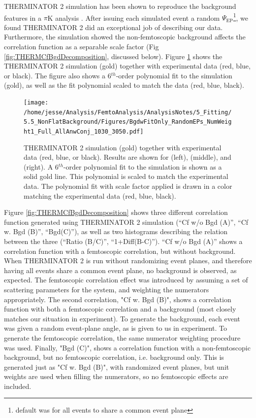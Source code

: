 \documentclass[/home/jesse/Analysis/FemtoAnalysis/AnalysisNotes/AnalysisNoteJBuxton.tex]{subfiles}
\begin{document}
THERMINATOR 2 simulation has been shown to reproduce the background features in a $\pi$K analysis \cite{Kisiel:2017}.  
After issuing each simulated event a random $\Psi_{\mathrm{EP}}$\footnote{default was for all events to share a common event plane}, we found THERMINATOR 2 did an exceptional job of describing our data.  
Furthermore, the simulation showed the non-femtoscopic background affects the correlation function as a separable scale factor (Fig \ref{fig:THERMCfBgdDecomposition}, discussed below).
Figure \ref{fig:BgdswTHERM} shows the THERMINATOR 2 simulation (gold) together with experimental data (red, blue, or black).  
The figure also shows a 6$^{th}$-order polynomial fit to the simulation (gold), as well as the fit polynomial scaled to match the data (red, blue, black).


\begin{figure}[h]
  \centering
  \texttt{[image: /home/jesse/Analysis/FemtoAnalysis/AnalysisNotes/5\_Fitting/5.5\_NonFlatBackground/Figures/BgdwFitOnly\_RandomEPs\_NumWeight1\_Full\_AllAnwConj\_1030\_3050.pdf]}
  \caption[Backgrounds with THERMINATOR 2]
  {
  THERMINATOR 2 simulation (gold) together with experimental data (red, blue, or black).  
  Results are shown for \LamKchP (left), \LamKchM (middle), and \LamKs (right).
  A 6$^{th}$-order polynomial fit to the simulation is shown as a solid gold line.  
  This polynomial is scaled to match the experimental data.  
  The polynomial fit with scale factor applied is drawn in a color matching the experimental data (red, blue, black).
  }
  \label{fig:BgdswTHERM}
\end{figure} 

Figure \ref{fig:THERMCfBgdDecomposition} shows three different correlation function generated using THERMINATOR 2 simulation (``Cf w/o Bgd (A)'', ``Cf w. Bgd (B)'', ``Bgd(C)''), as well as two histograms describing the relation between the three (``Ratio (B/C)'', ``1+Diff(B-C)'').  
``Cf w/o Bgd (A)'' shows a correlation function with a femtoscopic correlation, but without background.  
When THERMINATOR 2 is run without randomizing event planes, and therefore having all events share a common event plane, no background is observed, as expected.  
The femtoscopic correlation effect was introduced by assuming a set of scattering parameters for the system, and weighting the numerators appropriately.  
The second correlation, "Cf w. Bgd (B)", shows a correlation function with both a femtoscopic correlation and a background (most closely matches our situation in experiment).  
To generate the background, each event was given a random event-plane angle, as is given to us in experiment.  
To generate the femtoscopic correlation, the same numerator weighting procedure was used.  
Finally, "Bgd (C)", shows a correlation function with a non-femtoscopic background, but no femtoscopic correlation, i.e. background only.  
This is generated just as "Cf w. Bgd (B)", with randomized event planes, but unit weights are used when filling the numerators, so no femtoscopic effects are included.
\end{document}
